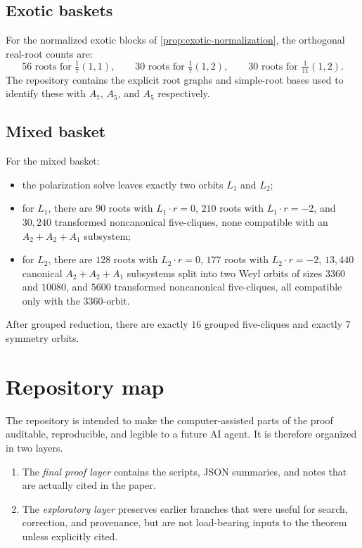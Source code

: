 \documentclass[11pt]{article}
\theoremstyle{definition}
\begin{document}
\subsection*{Exotic baskets}
For the normalized exotic blocks of \cref{prop:exotic-normalization}, the orthogonal real-root counts are:
\[
56 \text{ roots for } \tfrac17(1,1),
\qquad
30 \text{ roots for } \tfrac17(1,2),
\qquad
30 \text{ roots for } \tfrac1{11}(1,2).
\]
The repository contains the explicit root graphs and simple-root bases used to identify these with $A_7$, $A_5$, and $A_5$ respectively.

\subsection*{Mixed basket}
For the mixed basket:
\begin{itemize}
\item the polarization solve leaves exactly two orbits $L_1$ and $L_2$;
\item for $L_1$, there are $90$ roots with $L_1\cdot r=0$, $210$ roots with $L_1\cdot r=-2$, and $30{,}240$ transformed noncanonical five-cliques, none compatible with an $A_2+A_2+A_1$ subsystem;
\item for $L_2$, there are $128$ roots with $L_2\cdot r=0$, $177$ roots with $L_2\cdot r=-2$, $13{,}440$ canonical $A_2+A_2+A_1$ subsystems split into two Weyl orbits of sizes $3360$ and $10080$, and $5600$ transformed noncanonical five-cliques, all compatible only with the $3360$-orbit.
\end{itemize}
After grouped reduction, there are exactly $16$ grouped five-cliques and exactly $7$ symmetry orbits.

\section{Repository map}\label{app:repo}
The repository is intended to make the computer-assisted parts of the proof auditable, reproducible, and legible to a future AI agent. It is therefore organized in two layers.

\begin{enumerate}[label=\textup{(\roman*)}]
\item The \emph{final proof layer} contains the scripts, JSON summaries, and notes that are actually cited in the paper.
\item The \emph{exploratory layer} preserves earlier branches that were useful for search, correction, and provenance, but are not load-bearing inputs to the theorem unless explicitly cited.
\end{enumerate}
\end{document}
